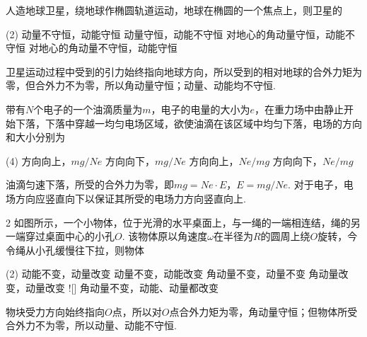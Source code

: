 \begin{problem}
人造地球卫星，绕地球作椭圆轨道运动，地球在椭圆的一个焦点上，则卫星的
\begin{tasks}(2)
    \task 动量不守恒，动能守恒
    \task 动量守恒，动能不守恒
    \task[\true] 对地心的角动量守恒，动能不守恒
    \task 对地心的角动量不守恒，动能守恒
\end{tasks}
\end{problem}
\begin{solution}
卫星运动过程中受到的引力始终指向地球方向，所以受到的相对地球的合外力矩为零，但合外力不为零，所以角动量守恒；动量、动能均不守恒.
\end{solution}

\begin{problem}
带有$N$个电子的一个油滴质量为$m$，电子的电量的大小为$e$，在重力场中由静止开始下落，下落中穿越一均匀电场区域，欲使油滴在该区域中均匀下落，电场的方向和大小分别为
\begin{tasks}(4)
    \task 方向向上，$mg/Ne$
    \task[\true] 方向向下，$mg/Ne$
    \task 方向向上，$Ne/mg$
    \task 方向向下，$Ne/mg$
\end{tasks}
\end{problem}
\begin{solution}
    油滴匀速下落，所受的合外力为零，即$mg=Ne\cdot E$，$E=mg/Ne$. 对于电子，电场方向应竖直向下以保证其所受的电场力方向竖直向上.
\end{solution}

\begin{problem} %
\begin{paracol}{2}
    如图所示，一个小物体，位于光滑的水平桌面上，与一绳的一端相连结，绳的另一端穿过桌面中心的小孔$O$. 该物体原以角速度$\omega$在半径为$R$的圆周上绕$O$旋转，今令绳从小孔缓慢往下拉，则物体
    \switchcolumn\centering
\end{paracol}
\begin{tasks}(2)
    \task 动能不变，动量改变
    \task 动量不变，动能改变
    \task 角动量不变，动量不变
    \task 角动量改变，动量改变
    \task![\true] 角动量不变，动能、动量都改变
\end{tasks}
\end{problem}
\begin{solution}
    物块受力方向始终指向$O$点，所以对$O$点合外力矩为零，角动量守恒；但物体所受合外力不为零，所以动量、动能不守恒.
\end{solution}

